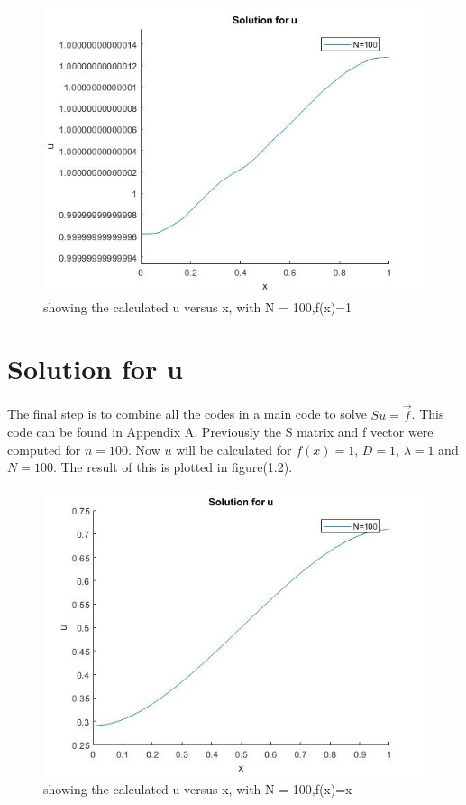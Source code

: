 \documentclass[a4paper]{report}
\begin{document}
\begin{figure}[ht!]
	\centering
	\includegraphics[width=150mm]{1Df1.jpg}
	\caption{showing the calculated u versus x, with N = 100,f(x)=1 \label{overflow}}
\end{figure}

\section{Solution for u}
The final step is to combine all the codes in a main code to solve $Su= \vec{f}$. This code can be found in Appendix A. Previously the S matrix and f vector were computed for $n = 100$. Now $u$ will be calculated for $f(x)=1$, $D=1$, $\lambda = 1$ and $N = 100$. The result of this is plotted in figure(1.2). 


\begin{figure}[ht!]
	\centering
	\includegraphics[width=140mm]{1Dfx.jpg}
	\caption{showing the calculated u versus x, with N = 100,f(x)=x 		 \label{overflow}}
\end{figure}
\end{document}
